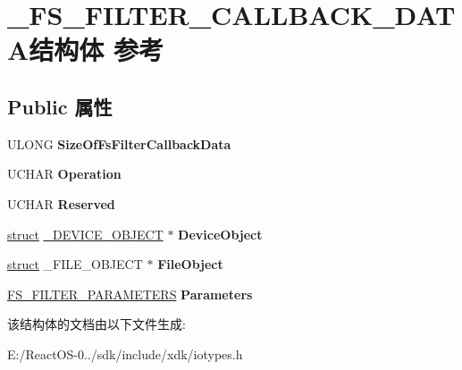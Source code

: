 \hypertarget{struct___f_s___f_i_l_t_e_r___c_a_l_l_b_a_c_k___d_a_t_a}{}\section{\+\_\+\+F\+S\+\_\+\+F\+I\+L\+T\+E\+R\+\_\+\+C\+A\+L\+L\+B\+A\+C\+K\+\_\+\+D\+A\+T\+A结构体 参考}
\label{struct___f_s___f_i_l_t_e_r___c_a_l_l_b_a_c_k___d_a_t_a}
\subsection*{Public 属性}
\begin{DoxyCompactItemize}
\item 
\mbox{\label{struct___f_s___f_i_l_t_e_r___c_a_l_l_b_a_c_k___d_a_t_a_aab23365108b0bec0c251020151daacef}} 
U\+L\+O\+NG {\bfseries Size\+Of\+Fs\+Filter\+Callback\+Data}
\item 
\mbox{\label{struct___f_s___f_i_l_t_e_r___c_a_l_l_b_a_c_k___d_a_t_a_aec88d681044dc68184ddc8ad72453259}} 
U\+C\+H\+AR {\bfseries Operation}
\item 
\mbox{\label{struct___f_s___f_i_l_t_e_r___c_a_l_l_b_a_c_k___d_a_t_a_a9763aac84b8765d1db6a4a4b82aa0cec}} 
U\+C\+H\+AR {\bfseries Reserved}
\item 
\mbox{\label{struct___f_s___f_i_l_t_e_r___c_a_l_l_b_a_c_k___d_a_t_a_a6a5ec253d4f6bb6d1075f067388c9976}} 
\hyperlink{interfacestruct}{struct} \hyperlink{struct___d_e_v_i_c_e___o_b_j_e_c_t}{\+\_\+\+D\+E\+V\+I\+C\+E\+\_\+\+O\+B\+J\+E\+CT} $\ast$ {\bfseries Device\+Object}
\item 
\mbox{\label{struct___f_s___f_i_l_t_e_r___c_a_l_l_b_a_c_k___d_a_t_a_af961a9821b3fdac414dc8a92629205c1}} 
\hyperlink{interfacestruct}{struct} \+\_\+\+F\+I\+L\+E\+\_\+\+O\+B\+J\+E\+CT $\ast$ {\bfseries File\+Object}
\item 
\mbox{\label{struct___f_s___f_i_l_t_e_r___c_a_l_l_b_a_c_k___d_a_t_a_a14fed3b13bcabcaab2f4280321db8747}} 
\hyperlink{union___f_s___f_i_l_t_e_r___p_a_r_a_m_e_t_e_r_s}{F\+S\+\_\+\+F\+I\+L\+T\+E\+R\+\_\+\+P\+A\+R\+A\+M\+E\+T\+E\+RS} {\bfseries Parameters}
\end{DoxyCompactItemize}


该结构体的文档由以下文件生成\+:\begin{DoxyCompactItemize}
\item 
E\+:/\+React\+O\+S-\/0../sdk/include/xdk/iotypes.\+h\end{DoxyCompactItemize}

